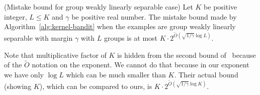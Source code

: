 \begin{corollary}
(Mistake bound for group weakly linearly separable case) 
Let $K$ be positive integer, $L\leq K$ and $\gamma$ be positive real number. 
The mistake bound made by Algorithm~\ref{alg:kernel-bandit} when the examples are group weakly
linearly separable with margin $\gamma$ with $L$ groups is at most
$K\cdot 2^{\tilde{O}(\sqrt{1/\gamma}\log L)}$.
\label{cor:mistake-bound}
\end{corollary}

Note that multiplicative factor of $K$ is hidden from the second bound of~\cite{BeygelzimerPSTWZ2019-separable} because of the $\tilde{O}$ notation on the exponent.  We cannot do that because in our exponent we have only $\log L$ which can be much smaller than $K$.  Their actual bound (showing $K$), which can be compared to ours, is $K\cdot 2^{\tilde{O}(\sqrt{1/\gamma}\log K)}$.
  